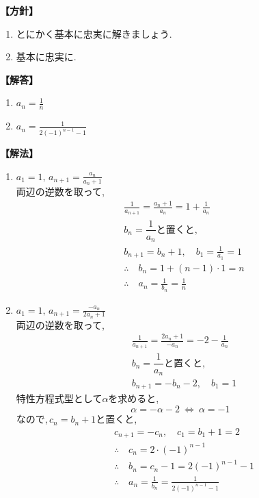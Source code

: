 \documentclass[dvipdfmx,a4paper,11pt,fleqn,openany]{jsbook}
\begin{document}
      \noindent\textbf{【方針】}
      \begin{enumerate}[label=(\arabic*),parsep=3pt]
        \item とにかく基本に忠実に解きましょう.
        \item 基本に忠実に.
      \end{enumerate}

      \noindent\textbf{【解答】}
      \begin{enumerate}[label=(\arabic*),parsep=3pt]
        \item $\displaystyle a_n=\frac{1}{n}$
        \item $\displaystyle a_n=\frac{1}{2(-1)^{n-1}-1}$
      \end{enumerate}

      \noindent\textbf{【解法】}
      \begin{enumerate}[label=(\arabic*),parsep=3pt]
        \item $\displaystyle a_1=1,\, a_{n+1}=\frac{a_n}{a_n+1}$\\
              両辺の逆数を取って,
              \begin{align*}
                &\frac{1}{a_{n+1}}=\frac{a_n+1}{a_n}=1+\frac{1}{a_n}\\
                &\text{$b_n=\dfrac{1}{a_n}$と置くと,}\\
                &b_{n+1}=b_n+1,\quad b_1=\frac{1}{a_1}=1\\
                &\therefore \quad b_n=1+(n-1)\cdot1=n\\
                &\therefore \quad a_n=\frac{1}{b_n}=\frac{1}{n}
              \end{align*}
        \item $\displaystyle a_1=1,\, a_{n+1}=\frac{-a_n}{2a_n+1}$\\
              両辺の逆数を取って,
              \begin{align*}
                &\frac{1}{a_{n+1}}=\frac{2a_n+1}{-a_n}=-2-\frac{1}{a_n}\\
                &\text{$b_n=\dfrac{1}{a_n}$と置くと,}\\
                &b_{n+1}=-b_n-2,\quad b_1=1
              \end{align*}
              特性方程式型として$\alpha$を求めると,
              \[
                \alpha=-\alpha-2 \ \Leftrightarrow\ \alpha=-1
              \]
              なので,\,$c_n=b_n+1$と置くと,
              \begin{align*}
                &c_{n+1}=-c_n,\quad c_1=b_1+1=2\\
                &\therefore \quad c_n=2\cdot(-1)^{n-1}\\
                &\therefore \quad b_n=c_n-1=2(-1)^{n-1}-1\\
                &\therefore \quad a_n=\frac{1}{b_n}=\frac{1}{2(-1)^{n-1}-1}
              \end{align*}
      \end{enumerate}
\end{document}
